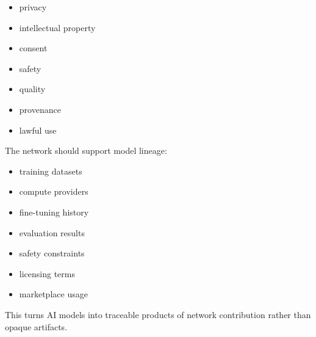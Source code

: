 ﻿\documentclass[12pt]{article}
\begin{document}
\begin{itemize}
  \item privacy
\end{itemize}
\begin{itemize}
  \item intellectual property
\end{itemize}
\begin{itemize}
  \item consent
\end{itemize}
\begin{itemize}
  \item safety
\end{itemize}
\begin{itemize}
  \item quality
\end{itemize}
\begin{itemize}
  \item provenance
\end{itemize}
\begin{itemize}
  \item lawful use
\end{itemize}

The network should support model lineage:

\begin{itemize}
  \item training datasets
\end{itemize}
\begin{itemize}
  \item compute providers
\end{itemize}
\begin{itemize}
  \item fine-tuning history
\end{itemize}
\begin{itemize}
  \item evaluation results
\end{itemize}
\begin{itemize}
  \item safety constraints
\end{itemize}
\begin{itemize}
  \item licensing terms
\end{itemize}
\begin{itemize}
  \item marketplace usage
\end{itemize}

This turns AI models into traceable products of network contribution rather than opaque artifacts.
\end{document}
